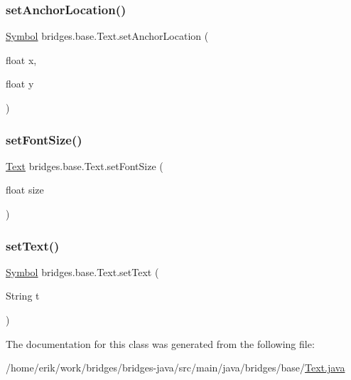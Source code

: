 \subsubsection{\texorpdfstring{set\+Anchor\+Location()}{setAnchorLocation()}}
{\footnotesize\ttfamily \hyperlink{classbridges_1_1base_1_1_symbol}{Symbol} bridges.\+base.\+Text.\+set\+Anchor\+Location (\begin{DoxyParamCaption}\item[{float}]{x,  }\item[{float}]{y }\end{DoxyParamCaption})}

\mbox{\label{classbridges_1_1base_1_1_text_a151f12946439cfdab49e4aaf791f3c32}} 
\subsubsection{\texorpdfstring{set\+Font\+Size()}{setFontSize()}}
{\footnotesize\ttfamily \hyperlink{classbridges_1_1base_1_1_text}{Text} bridges.\+base.\+Text.\+set\+Font\+Size (\begin{DoxyParamCaption}\item[{float}]{size }\end{DoxyParamCaption})}

\mbox{\label{classbridges_1_1base_1_1_text_a57e1d8586ce57eeed2eac1c92d9fbc7c}} 
\subsubsection{\texorpdfstring{set\+Text()}{setText()}}
{\footnotesize\ttfamily \hyperlink{classbridges_1_1base_1_1_symbol}{Symbol} bridges.\+base.\+Text.\+set\+Text (\begin{DoxyParamCaption}\item[{String}]{t }\end{DoxyParamCaption})}



The documentation for this class was generated from the following file\+:\begin{DoxyCompactItemize}
\item 
/home/erik/work/bridges/bridges-\/java/src/main/java/bridges/base/\hyperlink{_text_8java}{Text.\+java}\end{DoxyCompactItemize}
